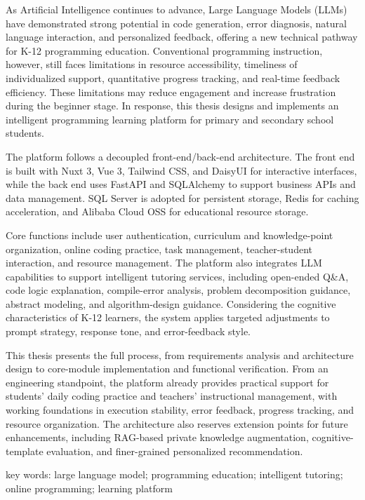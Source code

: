 {\setlength{\baselineskip}{20pt}
As Artificial Intelligence continues to advance, Large Language Models (LLMs) have demonstrated strong potential in code generation, error diagnosis, natural language interaction, and personalized feedback, offering a new technical pathway for K-12 programming education. Conventional programming instruction, however, still faces limitations in resource accessibility, timeliness of individualized support, quantitative progress tracking, and real-time feedback efficiency. These limitations may reduce engagement and increase frustration during the beginner stage. In response, this thesis designs and implements an intelligent programming learning platform for primary and secondary school students.

The platform follows a decoupled front-end/back-end architecture. The front end is built with Nuxt 3, Vue 3, Tailwind CSS, and DaisyUI for interactive interfaces, while the back end uses FastAPI and SQLAlchemy to support business APIs and data management. SQL Server is adopted for persistent storage, Redis for caching acceleration, and Alibaba Cloud OSS for educational resource storage.

Core functions include user authentication, curriculum and knowledge-point organization, online coding practice, task management, teacher-student interaction, and resource management. The platform also integrates LLM capabilities to support intelligent tutoring services, including open-ended Q\&A, code logic explanation, compile-error analysis, problem decomposition guidance, abstract modeling, and algorithm-design guidance. Considering the cognitive characteristics of K-12 learners, the system applies targeted adjustments to prompt strategy, response tone, and error-feedback style.

This thesis presents the full process, from requirements analysis and architecture design to core-module implementation and functional verification. From an engineering standpoint, the platform already provides practical support for students' daily coding practice and teachers' instructional management, with working foundations in execution stability, error feedback, progress tracking, and resource organization. The architecture also reserves extension points for future enhancements, including RAG-based private knowledge augmentation, cognitive-template evaluation, and finer-grained personalized recommendation.

\vspace{20pt}
\noindent{} key words: large language model; programming education; intelligent tutoring; online programming; learning platform
}

